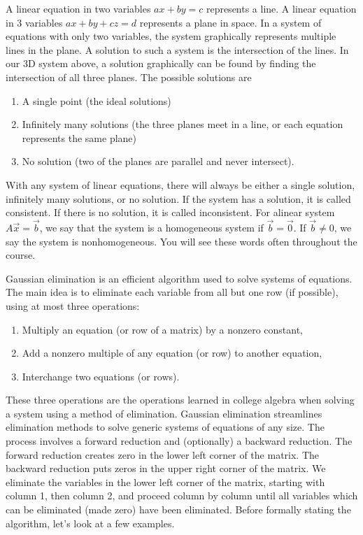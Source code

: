 \documentclass[10pt]{article}
\begin{document}
A linear equation in two variables $ax+by=c$ represents a line.  A linear equation in 3 variables $ax+by+cz=d$ represents a plane in space. In a system of equations with only two variables, the system graphically represents multiple lines in the plane. A solution to such a system is the intersection of the lines.  In our 3D system above, a solution graphically can be found by finding the intersection of all three planes. The possible solutions are
\begin{enumerate}
\item A single point (the ideal solutions)
\item Infinitely many solutions (the three planes meet in a line, or each equation represents the same plane)
\item No solution (two of the planes are parallel and never intersect).
\end{enumerate}
With any system of linear equations, there will always be either a single solution, infinitely many solutions, or no solution.  If the system has a solution, it is called consistent. If there is no solution, it is called inconsistent. For alinear system {$A\vec x = \vec b$}, we say that the system is a homogeneous system if {$\vec b=\vec 0$}. If {$\vec b\neq 0$}, we say the system is nonhomogeneous.  You will see these words often throughout the course. 

Gaussian elimination is an efficient algorithm used to solve systems of equations.  The main idea is to eliminate each variable from all but one row (if possible), using at most three operations:
\begin{enumerate}
  \item Multiply an equation (or row of a matrix) by a nonzero constant,
  \item Add a nonzero multiple of any equation (or row) to another equation,
  \item Interchange two equations (or rows).
\end{enumerate}
These three operations are the operations learned in college algebra when solving a system using a method of elimination.  Gaussian elimination streamlines elimination methods to solve generic systems of equations of any size. The process involves a forward reduction and (optionally) a backward reduction. The forward reduction creates zero in the lower left corner of the matrix.  The backward reduction puts zeros in the upper right corner of the matrix. We eliminate the variables in the lower left corner of the matrix, starting with column 1, then column 2, and proceed column by column until all variables which can be eliminated (made zero) have been eliminated. Before formally stating the algorithm, let's look at a few examples. 
\end{document}
